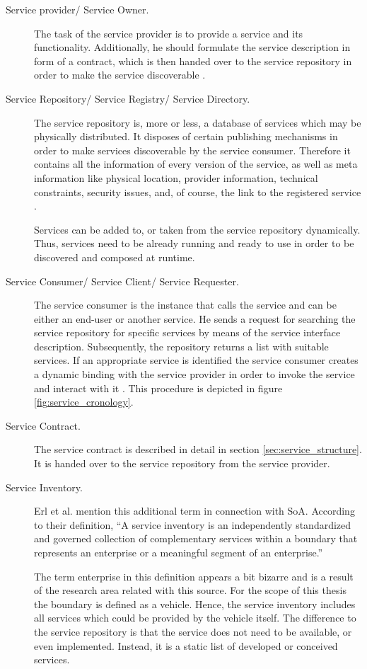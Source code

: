 \begin{description}
\item [Service provider/ Service Owner.] 
The task of the service provider is to provide a service and its functionality. Additionally, he should formulate the service description in form of a contract, which is then handed over to the service repository in order to make the service discoverable \cite{breivold}.

\item [Service Repository/ Service Registry/ Service Directory.]
The service repository is, more or less, a database of services which may be physically distributed. It disposes of certain publishing mechanisms in order to make services discoverable by the service consumer. Therefore it contains all the information of every version of the service, as well as meta information like physical location, provider information, technical constraints, security issues, and, of course, the link to the registered service \cite[p.60-61]{krafzig} \cite{breivold} \cite{converge}.

Services can be added to, or taken from the service repository dynamically. Thus, services need to be already running and ready to use in order to be discovered and composed at runtime.

\item [Service Consumer/ Service Client/ Service Requester.]
The service consumer is the instance that calls the service and can be either an end-user or another service. He sends a request for searching the service repository for specific services by means of the service interface description. Subsequently, the repository returns a list with suitable services. If an appropriate service is identified the service consumer creates a dynamic binding with the service provider in order to invoke the service and interact with it \cite{breivold} \cite{converge}. This procedure is depicted in figure \ref{fig:service_cronology}.

\item [Service Contract.]
The service contract is described in detail in section \ref{sec:service_structure}. It is handed over to the service repository from the service provider.

\item [Service Inventory.]
Erl et al. \cite[p.41]{erl2011} mention this additional term in connection with SoA. According to their definition, ``A service inventory is an independently standardized and governed collection of complementary services within a boundary that represents an enterprise or a meaningful segment of an enterprise.'' 

The term enterprise in this definition appears a bit bizarre and is a result of the research area related with this source. For the scope of this thesis the boundary is defined as a vehicle. Hence, the service inventory includes all services which could be provided by the vehicle itself. The difference to the service repository is that the service does not need to be available, or even implemented. Instead, it is a static list of developed or conceived services.
\end{description}

